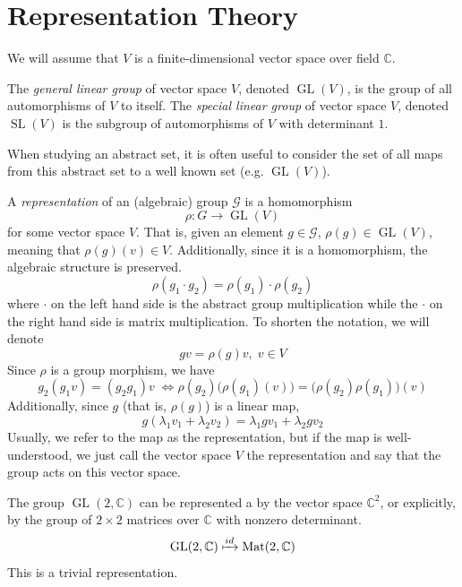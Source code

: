 \documentclass{article}
\DeclareMathOperator{\GL}{GL}
\DeclareMathOperator{\SL}{SL}
\begin{document}
\section{Representation Theory}

  We will assume that $V$ is a finite-dimensional vector space over field $\mathbb{C}$. 
  \begin{definition}
  The \textit{general linear group} of vector space $V$, denoted $\GL(V)$, is the group of all automorphisms of $V$ to itself. The \textit{special linear group} of vector space $V$, denoted $\SL(V)$ is the subgroup of automorphisms of $V$ with determinant $1$. 
  \end{definition}
  When studying an abstract set, it is often useful to consider the set of all maps from this abstract set to a well known set (e.g. $\GL(V)$). 

  \begin{definition}
  A \textit{representation} of an (algebraic) group $\mathcal{G}$ is a homomorphism 
  \[\rho: G \longrightarrow \GL(V)\]
  for some vector space $V$. That is, given an element $g \in \mathcal{G}$, $\rho(g) \in \GL (V)$, meaning that $\rho(g)(v) \in V$. Additionally, since it is a homomorphism, the algebraic structure is preserved. 
  \[\rho(g_1 \cdot g_2) = \rho(g_1) \cdot \rho(g_2)\]
  where $\cdot$ on the left hand side is the abstract group multiplication while the $\cdot$ on the right hand side is matrix multiplication. To shorten the notation, we will denote 
  \[g v = \rho(g) v, \; v \in V\]
  Since $\rho$ is a group morphism, we have 
  \[g_2 (g_1 v) = (g_2 g_1) v \; \iff \rho(g_2) \big( \rho(g_1) (v) \big) = \big( \rho(g_2) \rho(g_1) \big) (v)\]
  Additionally, since $g$ (that is, $\rho(g)$) is a linear map, 
  \[g(\lambda_1 v_1 + \lambda_2 v_2) = \lambda_1 g v_1 + \lambda_2 g v_2\]
  Usually, we refer to the map as the representation, but if the map is well-understood, we just call the vector space $V$ the representation and say that the group acts on this vector space. 
  \end{definition}

  \begin{example}
  The group $\GL(2, \mathbb{C})$ can be represented a by the vector space $\mathbb{C}^2$, or explicitly, by the group of $2 \times 2$ matrices over $\mathbb{C}$ with nonzero determinant.
  \[\GL(2, \mathbb{C}) \xmapsto{id} \text{Mat}(2, \mathbb{C})\]
  This is a trivial representation. 
  \end{example}
\end{document}
